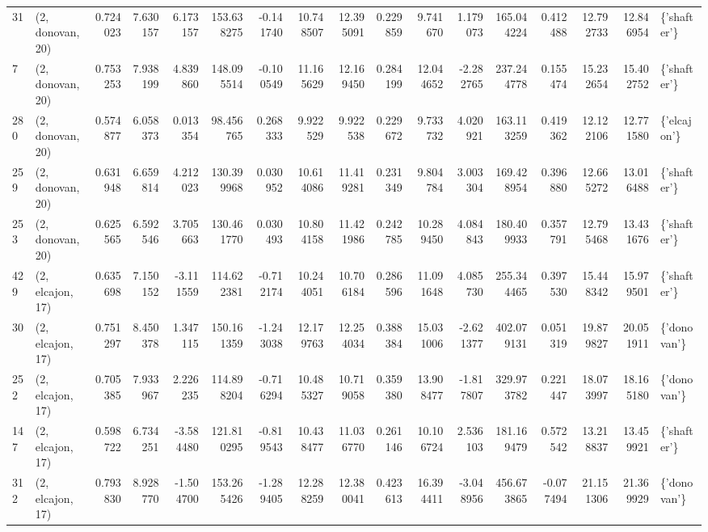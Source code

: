 \begin{tabular}{llrrrrrrrrrrrrrrl}
31  &  (2, donovan, 20) &   0.724023 &   7.630157 &   6.173157 &   153.638275 &  -0.141740 &  10.748507 &  12.395091 &  0.229859 &   9.741670 &   1.179073 &   165.044224 &   0.412488 &  12.792733 &  12.846954 &  \{'shafter'\} \\
7   &  (2, donovan, 20) &   0.753253 &   7.938199 &   4.839860 &   148.095514 &  -0.100549 &  11.165629 &  12.169450 &  0.284199 &  12.044652 &  -2.282765 &   237.244778 &   0.155474 &  15.232654 &  15.402752 &  \{'shafter'\} \\
280 &  (2, donovan, 20) &   0.574877 &   6.058373 &   0.013354 &    98.456765 &   0.268333 &   9.922529 &   9.922538 &  0.229672 &   9.733732 &   4.020921 &   163.113259 &   0.419362 &  12.122106 &  12.771580 &  \{'elcajon'\} \\
259 &  (2, donovan, 20) &   0.631948 &   6.659814 &   4.212023 &   130.399968 &   0.030952 &  10.614086 &  11.419281 &  0.231349 &   9.804784 &   3.003304 &   169.428954 &   0.396880 &  12.665272 &  13.016488 &  \{'shafter'\} \\
253 &  (2, donovan, 20) &   0.625565 &   6.592546 &   3.705663 &   130.461770 &   0.030493 &  10.804158 &  11.421986 &  0.242785 &  10.289450 &   4.084843 &   180.409933 &   0.357791 &  12.795468 &  13.431676 &  \{'shafter'\} \\
429 &  (2, elcajon, 17) &   0.635698 &   7.150152 &  -3.111559 &   114.622381 &  -0.712174 &  10.244051 &  10.706184 &  0.286596 &  11.091648 &   4.085730 &   255.344465 &   0.397530 &  15.448342 &  15.979501 &  \{'shafter'\} \\
30  &  (2, elcajon, 17) &   0.751297 &   8.450378 &   1.347115 &   150.161359 &  -1.243038 &  12.179763 &  12.254034 &  0.388384 &  15.031006 &  -2.621377 &   402.079131 &   0.051319 &  19.879827 &  20.051911 &  \{'donovan'\} \\
252 &  (2, elcajon, 17) &   0.705385 &   7.933967 &   2.226235 &   114.898204 &  -0.716294 &  10.485327 &  10.719058 &  0.359380 &  13.908477 &  -1.817807 &   329.973782 &   0.221447 &  18.073997 &  18.165180 &  \{'donovan'\} \\
147 &  (2, elcajon, 17) &   0.598722 &   6.734251 &  -3.584480 &   121.810295 &  -0.819543 &  10.438477 &  11.036770 &  0.261146 &  10.106724 &   2.536103 &   181.169479 &   0.572542 &  13.218837 &  13.459921 &  \{'shafter'\} \\
312 &  (2, elcajon, 17) &   0.793830 &   8.928770 &  -1.504700 &   153.265426 &  -1.289405 &  12.288259 &  12.380041 &  0.423613 &  16.394411 &  -3.048956 &   456.673865 &  -0.077494 &  21.151306 &  21.369929 &  \{'donovan'\} \\

\end{tabular}
